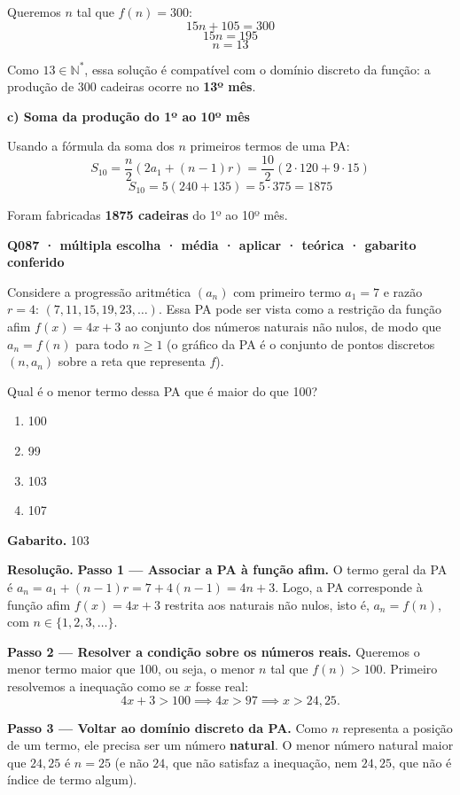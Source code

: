 \documentclass[11pt,a4paper]{article}
\begin{document}
Queremos $n$ tal que $f(n) = 300$:
$$15n + 105 = 300$$
$$15n = 195$$
$$n = 13$$

Como $13 \in \mathbb{N}^*$, essa solução é compatível com o domínio discreto da função: a produção de 300 cadeiras ocorre no \textbf{13º mês}.

\textbf{c) Soma da produção do 1º ao 10º mês}

Usando a fórmula da soma dos $n$ primeiros termos de uma PA:
$$S_{10} = \frac{n}{2}\left(2a_1 + (n-1)r\right) = \frac{10}{2}\left(2\cdot 120 + 9\cdot 15\right)$$
$$S_{10} = 5\left(240 + 135\right) = 5 \cdot 375 = 1875$$

Foram fabricadas \textbf{1875 cadeiras} do 1º ao 10º mês.

\bigskip\noindent\textbf{Q087 · múltipla escolha · média · aplicar · teórica · gabarito conferido}\par\nopagebreak
Considere a progressão aritmética $(a_n)$ com primeiro termo $a_1 = 7$ e razão $r = 4$: $(7, 11, 15, 19, 23, \dots)$. Essa PA pode ser vista como a restrição da função afim $f(x) = 4x + 3$ ao conjunto dos números naturais não nulos, de modo que $a_n = f(n)$ para todo $n \geq 1$ (o gráfico da PA é o conjunto de pontos discretos $(n, a_n)$ sobre a reta que representa $f$).

Qual é o menor termo dessa PA que é maior do que 100?
\begin{enumerate}[label=(\alph*)]
\item 100
\item 99
\item 103
\item 107
\end{enumerate}

\textbf{Gabarito.} 103

\textbf{Resolução.} \textbf{Passo 1 — Associar a PA à função afim.}
O termo geral da PA é $a_n = a_1 + (n-1)r = 7 + 4(n-1) = 4n + 3$. Logo, a PA corresponde à função afim $f(x) = 4x+3$ restrita aos naturais não nulos, isto é, $a_n = f(n)$, com $n \in \{1, 2, 3, \dots\}$.

\textbf{Passo 2 — Resolver a condição sobre os números reais.}
Queremos o menor termo maior que 100, ou seja, o menor $n$ tal que $f(n) > 100$. Primeiro resolvemos a inequação como se $x$ fosse real:
$$4x + 3 > 100 \implies 4x > 97 \implies x > 24{,}25.$$

\textbf{Passo 3 — Voltar ao domínio discreto da PA.}
Como $n$ representa a posição de um termo, ele precisa ser um número \textbf{natural}. O menor número natural maior que $24{,}25$ é $n = 25$ (e não $24$, que não satisfaz a inequação, nem $24{,}25$, que não é índice de termo algum).
\end{document}
